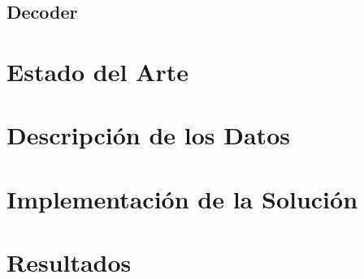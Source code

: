 \section{Decoder}

\chapter{Estado del Arte}

\chapter{Descripción de los Datos}

\chapter{Implementación de la Solución}

\chapter{Resultados}
